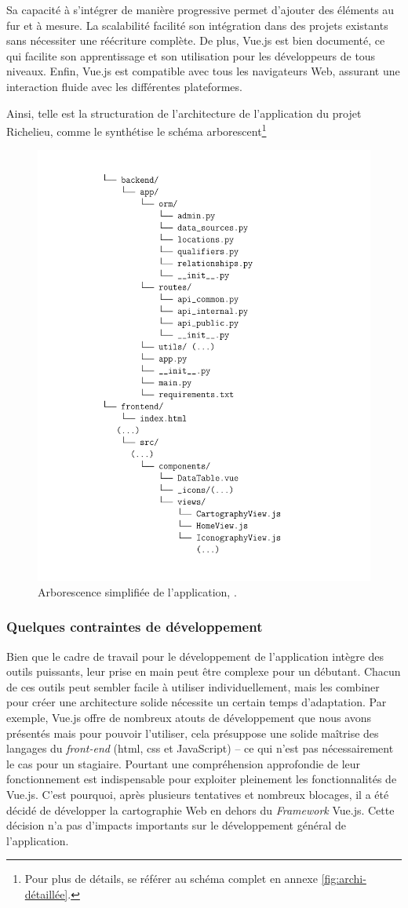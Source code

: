 Sa capacité à s'intégrer de manière progressive permet d'ajouter des éléments au fur et à mesure. La scalabilité facilité son intégration dans des projets existants sans nécessiter une réécriture complète. De plus, Vue.js est bien documenté, ce qui facilite son apprentissage et son utilisation pour les développeurs de tous niveaux. Enfin, Vue.js est compatible avec tous les navigateurs Web, assurant une interaction fluide avec les différentes plateformes. 

Ainsi, telle est la structuration de l'architecture de l'application du projet Richelieu, comme le synthétise le schéma arborescent\footnote{Pour plus de détails, se référer au schéma complet en annexe \ref{fig:archi-détaillée}.}

\begin{figure}
    \centering
    \includegraphics[width=0.5\linewidth]{images/architecture_appli_simplE.png}
    \caption{Arborescence simplifiée de l'application, \mhd.}
    \label{fig:app}
\end{figure}

\subsubsection{Quelques contraintes de développement}
Bien que le cadre de travail pour le développement de l'application intègre des outils puissants, leur prise en main peut être complexe pour un débutant. Chacun de ces outils peut sembler facile à utiliser individuellement, mais les combiner pour créer une architecture solide nécessite un certain temps d'adaptation. Par exemple, Vue.js offre de nombreux atouts de développement que nous avons présentés mais pour pouvoir l'utiliser, cela présuppose une solide maîtrise des langages du \textit{front-end} (\acrshort{html}, \acrshort{css} et JavaScript) -- ce qui n'est pas nécessairement le cas pour un stagiaire. Pourtant une compréhension approfondie de leur fonctionnement est indispensable pour exploiter pleinement les fonctionnalités de Vue.js. C'est pourquoi, après plusieurs tentatives et nombreux blocages, il a été décidé de développer la cartographie Web en dehors du \textit{Framework} Vue.js. Cette décision n'a pas d'impacts importants sur le développement général de l'application. 

